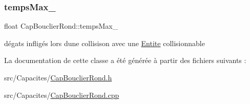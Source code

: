 \mbox{\label{class_cap_bouclier_rond_abb59fc2be98b9d69c2fb1a3f832bdb19}} 
\subsubsection{\texorpdfstring{temps\+Max\+\_\+}{tempsMax\_}}
{\footnotesize\ttfamily float Cap\+Bouclier\+Rond\+::temps\+Max\+\_\+\hspace{0.3cm}{\ttfamily [protected]}}



dégats infligés lors d\textquotesingle{}une collisison avec une \hyperlink{class_entite}{Entite} collisionnable 



La documentation de cette classe a été générée à partir des fichiers suivants \+:\begin{DoxyCompactItemize}
\item 
src/\+Capacites/\hyperlink{_cap_bouclier_rond_8h}{Cap\+Bouclier\+Rond.\+h}\item 
src/\+Capacites/\hyperlink{_cap_bouclier_rond_8cpp}{Cap\+Bouclier\+Rond.\+cpp}\end{DoxyCompactItemize}
